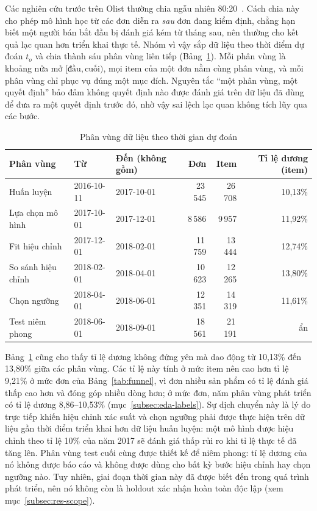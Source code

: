 \documentclass[12pt,a4paper]{report}
\begin{document}
Các nghiên cứu trước trên Olist thường chia ngẫu nhiên 80:20~\cite{orman2026}. Cách chia này cho phép mô hình học từ các đơn diễn ra \emph{sau} đơn đang kiểm định, chẳng hạn biết một người bán bắt đầu bị đánh giá kém từ tháng sau, nên thường cho kết quả lạc quan hơn triển khai thực tế. Nhóm vì vậy sắp dữ liệu theo thời điểm dự đoán $t_o$ và chia thành sáu phân vùng liên tiếp (Bảng~\ref{tab:split}). Mỗi phân vùng là khoảng nửa mở $[\text{đầu}, \text{cuối})$, mọi item của một đơn nằm cùng phân vùng, và mỗi phân vùng chỉ phục vụ đúng một mục đích. Nguyên tắc ``một phân vùng, một quyết định'' bảo đảm không quyết định nào được đánh giá trên dữ liệu đã dùng để đưa ra một quyết định trước đó, nhờ vậy sai lệch lạc quan không tích lũy qua các bước.

\begin{table}[htbp]\centering\small
\caption{Phân vùng dữ liệu theo thời gian dự đoán}\label{tab:split}
\begin{tabular}{lllrrr}
\toprule
Phân vùng & Từ & Đến (không gồm) & Đơn & Item & Tỉ lệ dương (item) \\
\midrule
Huấn luyện            & 2016-10-11 & 2017-10-01 & 23\,545 & 26\,708 & 10,13\% \\
Lựa chọn mô hình      & 2017-10-01 & 2017-12-01 &  8\,586 &  9\,957 & 11,92\% \\
Fit hiệu chỉnh        & 2017-12-01 & 2018-02-01 & 11\,759 & 13\,444 & 12,74\% \\
So sánh hiệu chỉnh    & 2018-02-01 & 2018-04-01 & 10\,623 & 12\,265 & 13,80\% \\
Chọn ngưỡng           & 2018-04-01 & 2018-06-01 & 12\,351 & 14\,319 & 11,61\% \\
Test niêm phong       & 2018-06-01 & 2018-09-01 & 18\,561 & 21\,191 & ẩn \\
\bottomrule
\end{tabular}
\end{table}

Bảng~\ref{tab:split} cũng cho thấy tỉ lệ dương không đứng yên mà dao động từ 10,13\% đến 13,80\% giữa các phân vùng. Các tỉ lệ này tính ở mức item nên cao hơn tỉ lệ 9,21\% ở mức đơn của Bảng~\ref{tab:funnel}, vì đơn nhiều sản phẩm có tỉ lệ đánh giá thấp cao hơn và đóng góp nhiều dòng hơn; ở mức đơn, năm phân vùng phát triển có tỉ lệ dương 8,86--10,53\% (mục~\ref{subsec:eda-labels}). Sự dịch chuyển này là lý do trực tiếp khiến hiệu chỉnh xác suất và chọn ngưỡng phải được thực hiện trên dữ liệu gần thời điểm triển khai hơn dữ liệu huấn luyện: một mô hình được hiệu chỉnh theo tỉ lệ 10\% của năm 2017 sẽ đánh giá thấp rủi ro khi tỉ lệ thực tế đã tăng lên. Phân vùng test cuối cùng được thiết kế để niêm phong: tỉ lệ dương của nó không được báo cáo và không được dùng cho bất kỳ bước hiệu chỉnh hay chọn ngưỡng nào. Tuy nhiên, giai đoạn thời gian này đã được biết đến trong quá trình phát triển, nên nó không còn là holdout xác nhận hoàn toàn độc lập (xem mục~\ref{subsec:res-scope}).
\end{document}
